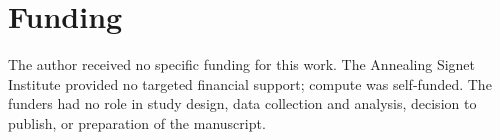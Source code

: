 \section*{Funding}
The author received no specific funding for this work. The Annealing Signet Institute
provided no targeted financial support; compute was self-funded. The funders had no
role in study design, data collection and analysis, decision to publish, or
preparation of the manuscript.


%


